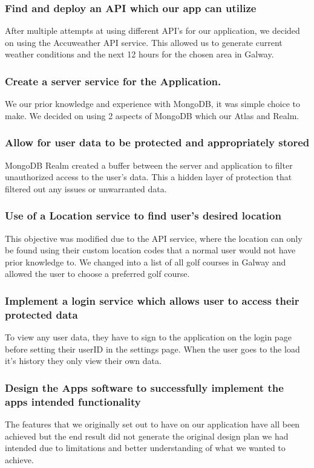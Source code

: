 \subsubsection {Find and deploy an API which our app can utilize}
After multiple attempts at using different API's for our application, we decided on using the Accuweather API service. This allowed us to generate current weather conditions and the next 12 hours for the chosen area in Galway.
\subsubsection {Create a server service for the Application.}
We our prior knowledge and experience with MongoDB, it was simple choice to make. We decided on using 2 aspects of MongoDB which our Atlas and Realm.
\subsubsection {Allow for user data to be protected and appropriately stored}
MongoDB Realm created a buffer between the server and application to filter unauthorized access to the user's data. This a hidden layer of protection that filtered out any issues or unwarranted data.
\subsubsection {Use of a Location service to find user's desired location}
This objective was modified due to the API service, where the location can only be found using their custom location codes that a normal user would not have prior knowledge to. We changed into a list of all golf courses in Galway and allowed the user to choose a preferred golf course.
\subsubsection {Implement a login service which allows user to access their \newline protected data}
To view any user data, they have to sign to the application on the login page before setting their userID in the settings page. When the user goes to the load it's history they only view their own data.
\subsubsection {Design the Apps software to successfully implement the apps intended functionality}
The features that we originally set out to have on our application have all been achieved but the end result did not generate the original design plan we had intended due to limitations and better understanding of what we wanted to achieve.
